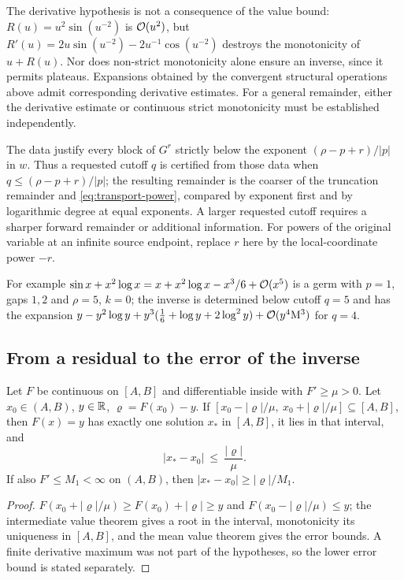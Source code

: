\begin{remark}
The derivative hypothesis is not a consequence of the value bound: $R(u)=u^2\sin(u^{-2})$ is $\mathcal O(u^2)$, but $R'(u)=2u\sin(u^{-2})-2u^{-1}\cos(u^{-2})$ destroys the monotonicity of $u+R(u)$. Nor does non-strict monotonicity alone ensure an inverse, since it permits plateaus. Expansions obtained by the convergent structural operations above admit corresponding derivative estimates. For a general remainder, either the derivative estimate or continuous strict monotonicity must be established independently.
\end{remark}

\begin{corollary}
The data justify every block of $G^r$ strictly below the exponent $(\rho-p+r)/|p|$ in $w$. Thus a requested cutoff $q$ is certified from those data when $q\le(\rho-p+r)/|p|$; the resulting remainder is the coarser of the truncation remainder and \eqref{eq:transport-power}, compared by exponent first and by logarithmic degree at equal exponents. A larger requested cutoff requires a sharper forward remainder or additional information. For powers of the original variable at an infinite source endpoint, replace $r$ here by the local-coordinate power $-r$.
\end{corollary}

For example $\sin x+x^2\log x=x+x^2\log x-x^3/6+\mathcal O(x^5)$ is a germ with $p=1$, gaps $1,2$ and $\rho=5$, $k=0$; the inverse is determined below cutoff $q=5$ and has the expansion $y-y^2\log y+y^3(\tfrac16+\log y+2\log^2y)+\mathcal O(y^4\mathrm M^3)$ for $q=4$.

\subsection{From a residual to the error of the inverse}

\begin{theorem}
\label{thm:bracket}
Let $F$ be continuous on $[A,B]$ and differentiable inside with $F'\ge\mu>0$. Let $x_0\in(A,B)$, $y\in\mathbb R$, $\varrho=F(x_0)-y$. If $[x_0-|\varrho|/\mu,\ x_0+|\varrho|/\mu]\subseteq[A,B]$, then $F(x)=y$ has exactly one solution $x_*$ in $[A,B]$, it lies in that interval, and
\begin{equation}
 |x_*-x_0|\ \le\ \frac{|\varrho|}{\mu} .
 \label{eq:bracket}
\end{equation}
If also $F'\le M_1<\infty$ on $(A,B)$, then $|x_*-x_0|\ge|\varrho|/M_1$.
\end{theorem}
\begin{proof}
$F(x_0+|\varrho|/\mu)\ge F(x_0)+|\varrho|\ge y$ and $F(x_0-|\varrho|/\mu)\le y$; the intermediate value theorem gives a root in the interval, monotonicity its uniqueness in $[A,B]$, and the mean value theorem gives the error bounds. A finite derivative maximum was not part of the hypotheses, so the lower error bound is stated separately.
\end{proof}

